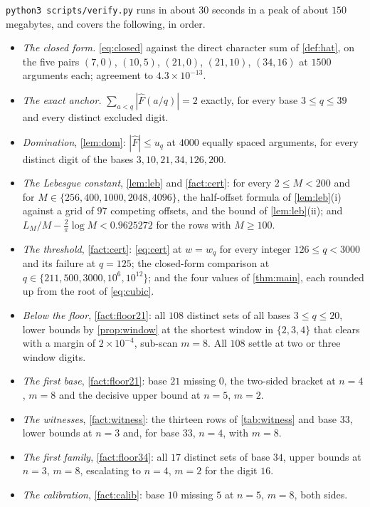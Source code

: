 \documentclass[11pt]{amsart}
\theoremstyle{definition}
\theoremstyle{remark}
\begin{document}
\texttt{python3 scripts/verify.py} runs in about $30$ seconds in a peak of about $150$ megabytes, and covers the following, in order.
\begin{itemize}
\item \emph{The closed form.} \cref{eq:closed} against the direct character sum of \cref{def:hat}, on the five pairs $(7,0)$, $(10,5)$, $(21,0)$, $(21,10)$, $(34,16)$ at $1500$ arguments each; agreement to $4.3\times10^{-13}$.
\item \emph{The exact anchor.} $\sum_{a<q}|\widehat{F}(a/q)| = 2$ exactly, for every base $3 \le q \le 39$ and every distinct excluded digit.
\item \emph{Domination}, \cref{lem:dom}: $|\widehat{F}| \le u_{q}$ at $4000$ equally spaced arguments, for every distinct digit of the bases $3, 10, 21, 34, 126, 200$.
\item \emph{The Lebesgue constant}, \cref{lem:leb} and \cref{fact:cert}: for every $2 \le M < 200$ and for $M \in \{256, 400, 1000, 2048, 4096\}$, the half-offset formula of \cref{lem:leb}(i) against a grid of $97$ competing offsets, and the bound of \cref{lem:leb}(ii); and $L_{M}/M - \frac{2}{\pi}\log M < 0.9625272$ for the rows with $M \ge 100$.
\item \emph{The threshold}, \cref{fact:cert}: \cref{eq:cert} at $w = w_{q}$ for every integer $126 \le q < 3000$ and its failure at $q = 125$; the closed-form comparison at $q \in \{211, 500, 3000, 10^{6}, 10^{12}\}$; and the four values of \cref{thm:main}, each rounded up from the root of \cref{eq:cubic}.
\item \emph{Below the floor}, \cref{fact:floor21}: all $108$ distinct sets of all bases $3 \le q \le 20$, lower bounds by \cref{prop:window} at the shortest window in $\{2,3,4\}$ that clears with a margin of $2\times10^{-4}$, sub-scan $m = 8$. All $108$ settle at two or three window digits.
\item \emph{The first base}, \cref{fact:floor21}: base $21$ missing $0$, the two-sided bracket at $n = 4$, $m = 8$ and the decisive upper bound at $n = 5$, $m = 2$.
\item \emph{The witnesses}, \cref{fact:witness}: the thirteen rows of \cref{tab:witness} and base $33$, lower bounds at $n = 3$ and, for base $33$, $n = 4$, with $m = 8$.
\item \emph{The first family}, \cref{fact:floor34}: all $17$ distinct sets of base $34$, upper bounds at $n = 3$, $m = 8$, escalating to $n = 4$, $m = 2$ for the digit $16$.
\item \emph{The calibration}, \cref{fact:calib}: base $10$ missing $5$ at $n = 5$, $m = 8$, both sides.
\end{itemize}
\end{document}
